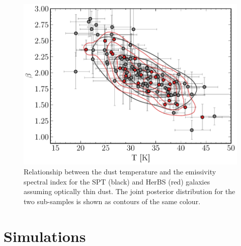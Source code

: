 \begin{figure}
	\centering
	\includegraphics[width=0.8\columnwidth]{Figures/beta_t_correlation.pdf}
	\caption[Relationship between $\beta$ and $T_\textrm{dust}$ for SPT and HerBS galaxies]{Relationship between the dust temperature and the emissivity spectral index for the SPT (black) and HerBS (red) galaxies assuming optically thin dust. The joint posterior distribution for the two sub-samples is shown as contours of the same colour.}
	\label{fig:beta_t_correlation}
\end{figure}

\section{Simulations}
\label{sec:simulations}

